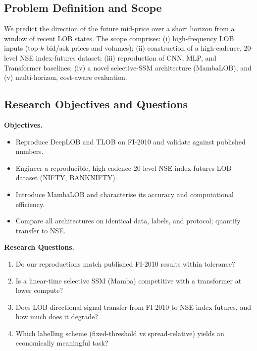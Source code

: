 \documentclass[11pt]{article}
\begin{document}
\subsection{Problem Definition and Scope}
We predict the direction of the future mid-price over a short horizon from a window of recent LOB states.
The scope comprises: (i) high-frequency LOB inputs (top-$k$ bid/ask prices and volumes); (ii) construction
of a high-cadence, 20-level NSE index-futures dataset; (iii) reproduction of CNN, MLP, and Transformer baselines;
(iv) a novel selective-SSM architecture (MambaLOB); and (v) multi-horizon, cost-aware evaluation.

\subsection{Research Objectives and Questions}
\textbf{Objectives.}
\begin{itemize}[nosep]
  \item Reproduce DeepLOB and TLOB on FI-2010 and validate against published numbers.
  \item Engineer a reproducible, high-cadence 20-level NSE index-futures LOB dataset (NIFTY, BANKNIFTY).
  \item Introduce MambaLOB and characterise its accuracy and computational efficiency.
  \item Compare all architectures on identical data, labels, and protocol; quantify transfer to NSE.
\end{itemize}
\textbf{Research Questions.}
\begin{enumerate}[nosep]
  \item Do our reproductions match published FI-2010 results within tolerance?
  \item Is a linear-time selective SSM (Mamba) competitive with a transformer at lower compute?
  \item Does LOB directional signal transfer from FI-2010 to NSE index futures, and how much does it degrade?
  \item Which labelling scheme (fixed-threshold vs spread-relative) yields an economically meaningful task?
\end{enumerate}
\end{document}
